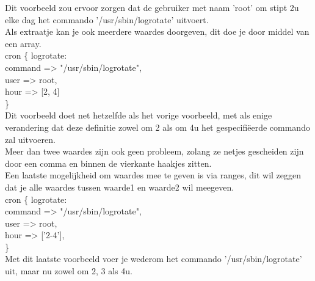 	Dit voorbeeld zou ervoor zorgen dat de gebruiker met naam 'root' om stipt 2u elke dag het commando '/usr/sbin/logrotate' uitvoert.\\
	Als extraatje kan je ook meerdere waardes doorgeven, dit doe je door middel van een array.\\

	cron \{ logrotate:\\
		command => "/usr/sbin/logrotate",\\
		user => root,\\
		hour => [2, 4]\\
	\}\\

	Dit voorbeeld doet net hetzelfde als het vorige voorbeeld, met als enige verandering dat deze definitie zowel om 2 als om 4u het gespecifi\"{e}erde commando zal uitvoeren.\\
	Meer dan twee waardes zijn ook geen probleem, zolang ze netjes gescheiden zijn door een comma en binnen de vierkante haakjes zitten.\\

	Een laatste mogelijkheid om waardes mee te geven is via ranges, dit wil zeggen dat je alle waardes tussen waarde1 en waarde2 wil meegeven.\\

	cron \{ logrotate:\\
		command => "/usr/sbin/logrotate",\\
		user => root,\\
		hour => ['2-4'],\\
	\}\\

	Met dit laatste voorbeeld voer je wederom het commando '/usr/sbin/logrotate' uit, maar nu zowel om 2, 3 als 4u.\\
